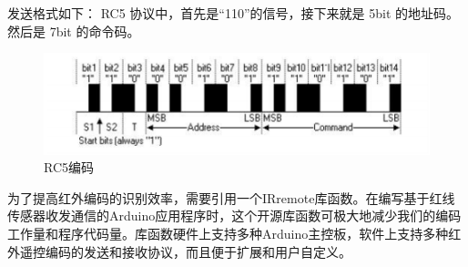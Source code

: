 发送格式如下：
RC5 协议中，首先是“110”的信号，接下来就是 5bit 的地址码。然后是 7bit 的命令码。
\begin{figure}[htbp]
	\centering
	\includegraphics[width=\linewidth]{figure/4-5}
	\caption{RC5编码}
	\label{fig:4-5}
\end{figure}

为了提高红外编码的识别效率，需要引用一个IRremote库函数。在编写基于红线传感器收发通信的Arduino应用程序时，这个开源库函数可极大地减少我们的编码工作量和程序代码量。库函数硬件上支持多种Arduino主控板，软件上支持多种红外遥控编码的发送和接收协议，而且便于扩展和用户自定义。

